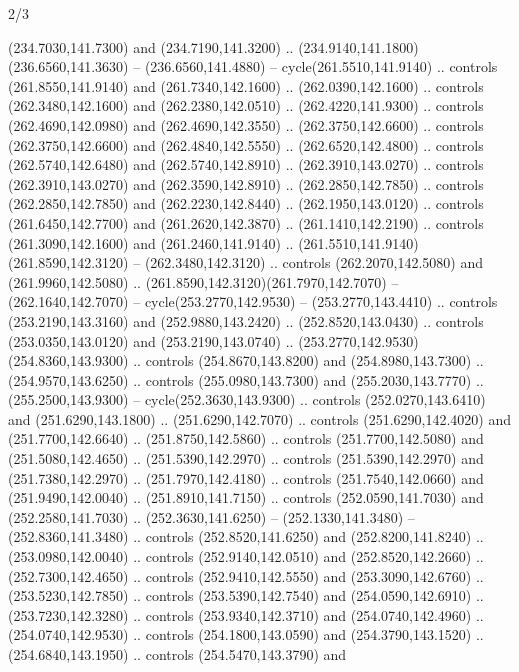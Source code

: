 \begin{flagdescription}{2/3}
\begin{scope}[xshift=0.5\flaglength,yshift=0.5\flagwidth,scale=\flagwidth/259.2]
\begin{scope}[y=0.8pt, x=0.8pt, yscale=-1,shift={(-243,-162)}]
      (234.7030,141.7300) and (234.7190,141.3200) ..
      (234.9140,141.1800)(236.6560,141.3630) -- (236.6560,141.4880) --
      cycle(261.5510,141.9140) .. controls (261.8550,141.9140) and
      (261.7340,142.1600) .. (262.0390,142.1600) .. controls (262.3480,142.1600) and
      (262.2380,142.0510) .. (262.4220,141.9300) .. controls (262.4690,142.0980) and
      (262.4690,142.3550) .. (262.3750,142.6600) .. controls (262.3750,142.6600) and
      (262.4840,142.5550) .. (262.6520,142.4800) .. controls (262.5740,142.6480) and
      (262.5740,142.8910) .. (262.3910,143.0270) .. controls (262.3910,143.0270) and
      (262.3590,142.8910) .. (262.2850,142.7850) .. controls (262.2850,142.7850) and
      (262.2230,142.8440) .. (262.1950,143.0120) .. controls (261.6450,142.7700) and
      (261.2620,142.3870) .. (261.1410,142.2190) .. controls (261.3090,142.1600) and
      (261.2460,141.9140) .. (261.5510,141.9140)(261.8590,142.3120) --
      (262.3480,142.3120) .. controls (262.2070,142.5080) and (261.9960,142.5080) ..
      (261.8590,142.3120)(261.7970,142.7070) -- (262.1640,142.7070) --
      cycle(253.2770,142.9530) -- (253.2770,143.4410) .. controls
      (253.2190,143.3160) and (252.9880,143.2420) .. (252.8520,143.0430) .. controls
      (253.0350,143.0120) and (253.2190,143.0740) ..
      (253.2770,142.9530)(254.8360,143.9300) .. controls (254.8670,143.8200) and
      (254.8980,143.7300) .. (254.9570,143.6250) .. controls (255.0980,143.7300) and
      (255.2030,143.7770) .. (255.2500,143.9300) -- cycle(252.3630,143.9300) ..
      controls (252.0270,143.6410) and (251.6290,143.1800) .. (251.6290,142.7070) ..
      controls (251.6290,142.4020) and (251.7700,142.6640) .. (251.8750,142.5860) ..
      controls (251.7700,142.5080) and (251.5080,142.4650) .. (251.5390,142.2970) ..
      controls (251.5390,142.2970) and (251.7380,142.2970) .. (251.7970,142.4180) ..
      controls (251.7540,142.0660) and (251.9490,142.0040) .. (251.8910,141.7150) ..
      controls (252.0590,141.7030) and (252.2580,141.7030) .. (252.3630,141.6250) --
      (252.1330,141.3480) -- (252.8360,141.3480) .. controls (252.8520,141.6250) and
      (252.8200,141.8240) .. (253.0980,142.0040) .. controls (252.9140,142.0510) and
      (252.8520,142.2660) .. (252.7300,142.4650) .. controls (252.9410,142.5550) and
      (253.3090,142.6760) .. (253.5230,142.7850) .. controls (253.5390,142.7540) and
      (254.0590,142.6910) .. (253.7230,142.3280) .. controls (253.9340,142.3710) and
      (254.0740,142.4960) .. (254.0740,142.9530) .. controls (254.1800,143.0590) and
      (254.3790,143.1520) .. (254.6840,143.1950) .. controls (254.5470,143.3790) and

\end{scope}
\end{scope}
\end{flagdescription}
